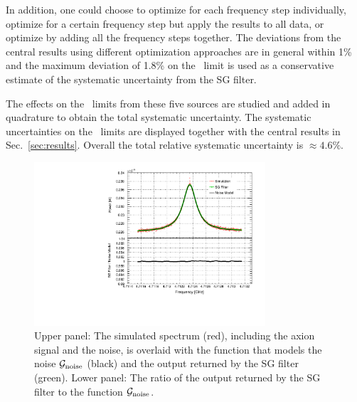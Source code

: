 \begin{itemize}
In addition, one could choose to optimize for each frequency step 
individually, optimize for a certain frequency step but apply the results to 
all data, or optimize by adding all the frequency steps together. 
The deviations from the central results using different optimization 
approaches are in general within 1\% and the 
maximum deviation of 1.8\% 
on the \gagg\ limit is used as a conservative estimate of the systematic 
uncertainty from the SG filter. 

\end{itemize}

The effects on the \gagg\ limits from these five sources are studied and added in 
quadrature to obtain the total systematic uncertainty. 
The systematic uncertainties on the \gagg\ limits 
are displayed together with the central results in Sec.~\ref{sec:results}. 
Overall the total relative systematic uncertainty is $\approx 4.6\%$.

\begin{figure} [htbp]
  \centering
  \includegraphics[width=8.6cm]{figures/GeneratedSpectrum_Optimized_SGFilter_NPar_3_Window_141.pdf}
  \caption{Upper panel: 
 The simulated spectrum (red), including the axion signal and the 
noise, is overlaid with the function that models the noise 
${\cal G}_\text{noise}$ (black) and the 
output returned by the SG filter (green). Lower panel: The ratio of the output 
returned by the SG filter to the function ${\cal G}_\text{noise}$.}
  \label{fig:sgcompare}
\end{figure}


